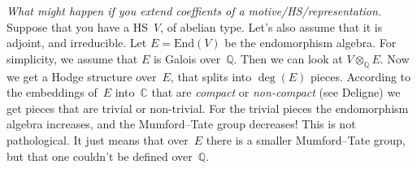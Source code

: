 \documentclass{amsart}
\begin{document}
\bigskip\noindent
\emph{What might happen if you extend coeffients of a motive/HS/representation.}\quad
Suppose that you have a HS~$V$, of abelian type.
Let's also assume that it is adjoint, and irreducible.
Let $E = \mathrm{End}(V)$ be the endomorphism algebra.
For simplicity, we assume that $E$ is Galois over~$\mathbb{Q}$.
Then we can look at $V \otimes_{\mathbb{Q}} E$.
Now we get a Hodge structure over~$E$, that splits into $\deg(E)$ pieces.
According to the embeddings of~$E$ into~$\mathbb{C}$
that are \emph{compact} or \emph{non-compact} (see Deligne)
we get pieces that are trivial or non-trivial.
For the trivial pieces the endomorphism algebra increases,
and the Mumford--Tate group decreases!
This is not pathological.
It just means that over~$E$ there is a smaller Mumford--Tate group,
but that one couldn't be defined over~$\mathbb{Q}$.

\printbibliography
\end{document}
